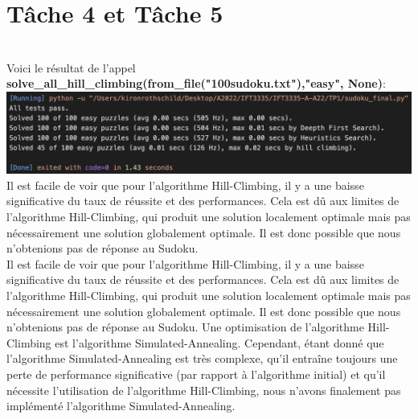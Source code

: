 \documentclass{article}
\begin{document}
\section*{Tâche 4 et Tâche 5}\\
Voici le résultat de l'appel\\
\textbf{solve\_all\_hill\_climbing(from\_file("100sudoku.txt"),"easy", None)}:\\
\includegraphics[width=1\textwidth]{t4.png}\\
Il est facile de voir que pour l'algorithme Hill-Climbing, il y a une baisse significative du taux de réussite et des performances. Cela est dû aux limites de l'algorithme Hill-Climbing, qui produit une solution localement optimale mais pas nécessairement une solution globalement optimale. Il est donc possible que nous n'obtenions pas de réponse au Sudoku.\\
Il est facile de voir que pour l'algorithme Hill-Climbing, il y a une baisse significative du taux de réussite et des performances. Cela est dû aux limites de l'algorithme Hill-Climbing, qui produit une solution localement optimale mais pas nécessairement une solution globalement optimale. Il est donc possible que nous n'obtenions pas de réponse au Sudoku.
Une optimisation de l'algorithme Hill-Climbing est l'algorithme Simulated-Annealing. Cependant, étant donné que l'algorithme Simulated-Annealing est très complexe, qu'il entraîne toujours une perte de performance significative (par rapport à l'algorithme initial) et qu'il nécessite l'utilisation de l'algorithme Hill-Climbing, nous n'avons finalement pas implémenté l'algorithme Simulated-Annealing.
\end{document}
